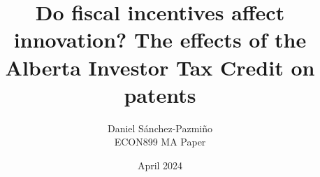 \documentclass[12pt, a4paper, margin = 1in]{article}
\title{Do fiscal incentives affect innovation? The effects of the Alberta Investor Tax Credit on patents}
\author{Daniel Sánchez-Pazmiño \\[1ex] ECON899 MA Paper}
\affil{Simon Fraser University}
\date{April 2024}
\renewenvironment{abstract}
 {\small
  \begin{center}
  \vspace{-1em}\vspace{0pt}
  \end{center}
  \quotation\itshape}
 {\endquotation}
\begin{document}
\maketitle

\begin{abstract}
    \lipsum[1]
\end{abstract}
\end{document}
